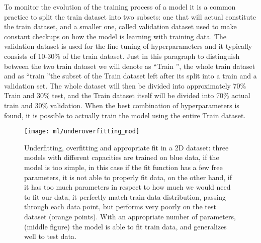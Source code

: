 \documentclass[11pt]{report}
\begin{document}
To monitor the evolution of the training process of a model it is a common practice to split the train dataset into two subsets: one that will actual constitute the train dataset, and a smaller one, called validation dataset used to make constant checkups on how the model is learning with training data.
The validation dataset is used for the fine tuning of hyperparameters and it typically consists of 10-30\% of the train dataset.
Just in this paragraph to distinguish between the two train dataset we will denote as \textquotedblleft Train \textquotedblright, the whole train dataset and as \textquotedblleft train \textquotedblright the subset of the Train dataset left after its split into a train and a validation set.
The whole dataset will then be divided into approximately 70\% Train and 30\% test, and the Train dataset itself will be divided into 70\% actual train and 30\% validation.
When the best combination of hyperparameters is found, it is possible to actually train the model using the entire Train dataset.


\begin{figure}
\centering
\texttt{[image: ml/underoverfitting\_mod]}
\caption{Underfitting, overfitting and appropriate fit in a 2D dataset: three models with different capacities are trained on blue data, if the model is too simple, in this case if the fit function has a few free parameters, it is not able to properly fit data, on the other hand, if it has too much parameters in respect to how much we would need to fit our data, it perfectly match train data distribution, passing through each data point, but performs very poorly on the test dataset (orange points). With an appropriate number of parameters, (middle figure) the model is able to fit train data, and generalizes well to test data.
}
\label{fig:underoverfitting}
\end{figure}
\end{document}

